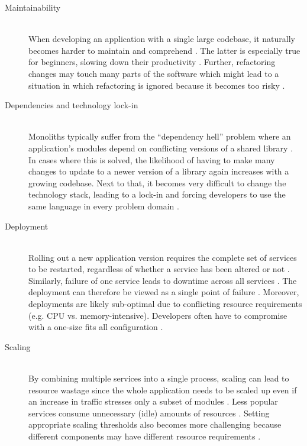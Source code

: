 \begin{description}
  \item[Maintainability]
  \hfill \\
  When developing an application with a single large codebase, it naturally becomes harder to maintain and comprehend \cite[p.~2]{dragoni2017microservices}. The latter is especially true for beginners, slowing down their productivity \cite[p.~24]{dmitry2014micro}. Further, refactoring changes may touch many parts of the software which might lead to a situation in which refactoring is ignored because it becomes too risky \cite[p.~35]{kalske2017challenges}.

 \item[Dependencies and technology lock-in]
  \hfill \\
  Monoliths typically suffer from the \enquote{dependency hell} problem where an application's modules depend on conflicting versions of a shared library \cite[p.~2]{dragoni2017microservices}. In cases where this is solved, the likelihood of having to make many changes to update to a newer version of a library again increases with a growing codebase. Next to that, it becomes very difficult to change the technology stack, leading to a lock-in and forcing developers to use the same language in every problem domain \cite[p.~24]{dmitry2014micro} \cite[p.~2]{dragoni2017microservices}.

  \item[Deployment]
  \hfill \\
  Rolling out a new application version requires the complete set of services to be restarted, regardless of whether a service has been altered or not \cite[p.~2]{dragoni2017microservices}. Similarly, failure of one service leads to downtime across all services \cite[p.~970]{vayghan2018deploying}. The deployment can therefore be viewed as a single point of failure \cite[p.~584]{villamizar2015evaluating}. Moreover, deployments are likely sub-optimal due to conflicting resource requirements (e.g. \acs{CPU} vs. memory-intensive). Developers often have to compromise with a one-size fits all configuration \cite[p.~2]{dragoni2017microservices}.

  \item[Scaling]
  \hfill \\
  By combining multiple services into a single process, scaling can lead to resource wastage since the whole application needs to be scaled up even if an increase in traffic stresses only a subset of modules \cite[p.~850]{singh2017container} \cite[p.~2]{dragoni2017microservices}. Less popular services consume unnecessary (idle) amounts of resources \cite[p.~584]{villamizar2015evaluating}. Setting appropriate scaling thresholds also becomes more challenging because different components may have different resource requirements \cite[p.~24]{dmitry2014micro}.
\end{description}


